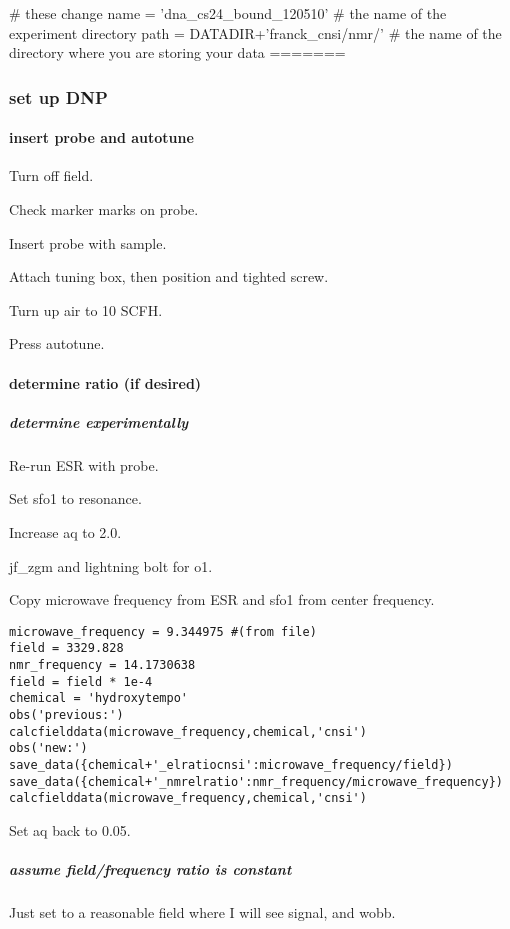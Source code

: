 \begin{scriptsize}
\begin{python}[off]
# these change
name = 'dna_cs24_bound_120510' # the name of the experiment directory
path = DATADIR+'franck_cnsi/nmr/' # the name of the directory where you are storing your data
=======
\subsubsection{set up DNP}

\paragraph{insert probe and autotune}

Turn off field.

Check marker marks on probe.

Insert probe with sample.

Attach tuning box, then position and tighted screw.

Turn up air to 10 SCFH.

Press autotune.

\paragraph{determine ratio (if desired)}

\subparagraph{determine experimentally}
Re-run ESR with probe.

Set sfo1 to resonance.  

Increase aq to 2.0.  

jf\_zgm and lightning bolt for o1.  

Copy microwave frequency from ESR and sfo1 from center frequency.  

\begin{lstlisting}
microwave_frequency = 9.344975 #(from file)
field = 3329.828
nmr_frequency = 14.1730638
field = field * 1e-4
chemical = 'hydroxytempo'
obs('previous:')
calcfielddata(microwave_frequency,chemical,'cnsi')
obs('new:')
save_data({chemical+'_elratiocnsi':microwave_frequency/field})
save_data({chemical+'_nmrelratio':nmr_frequency/microwave_frequency})
calcfielddata(microwave_frequency,chemical,'cnsi')
\end{lstlisting}

Set aq back to 0.05.


\subparagraph{assume field/frequency ratio is constant}

Just set to a reasonable field where I will see signal, and wobb.


\end{python}
\end{scriptsize}
